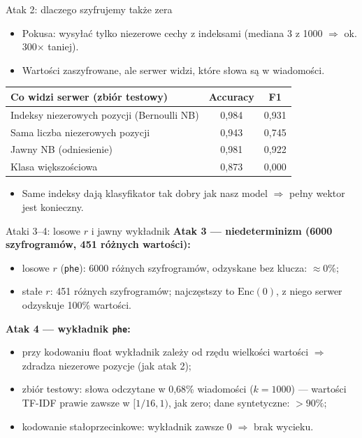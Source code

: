 \documentclass[aspectratio=169,11pt]{beamer}
\begin{document}
\begin{frame}{Atak 2: dlaczego szyfrujemy także zera}
  \begin{itemize}
    \item Pokusa: wysyłać tylko niezerowe cechy z indeksami (mediana 3 z 1000 $\Rightarrow$ ok. 300$\times$ taniej).
    \item Wartości zaszyfrowane, ale serwer widzi, \alert{które słowa} są w wiadomości.
  \end{itemize}
  \vspace{0.3em}
  \centering
  \begin{tabular}{@{}lcc@{}}
    \toprule
    Co widzi serwer (zbiór testowy) & Accuracy & F1 \\
    \midrule
    Indeksy niezerowych pozycji (Bernoulli NB) & 0,984 & 0,931 \\
    Sama liczba niezerowych pozycji & 0,943 & 0,745 \\
    Jawny NB (odniesienie) & 0,981 & 0,922 \\
    Klasa większościowa & 0,873 & 0,000 \\
    \bottomrule
  \end{tabular}
  \vspace{0.3em}
  \begin{itemize}
    \item Same indeksy dają klasyfikator \alert{tak dobry jak nasz model} $\Rightarrow$ pełny wektor jest konieczny.
  \end{itemize}
\end{frame}

\begin{frame}{Ataki 3--4: losowe $r$ i jawny wykładnik}
  \textbf{Atak 3 --- niedeterminizm (6000 szyfrogramów, 451 różnych wartości):}
  \begin{itemize}
    \item losowe $r$ (\texttt{phe}): 6000 różnych szyfrogramów, odzyskane bez klucza: $\approx 0\%$;
    \item stałe $r$: 451 różnych szyfrogramów; najczęstszy to $\mathrm{Enc}(0)$, z niego serwer odzyskuje \alert{100\%} wartości.
  \end{itemize}
  \vspace{0.5em}
  \textbf{Atak 4 --- wykładnik \texttt{phe}:}
  \begin{itemize}
    \item przy kodowaniu float wykładnik zależy od rzędu wielkości wartości $\Rightarrow$ zdradza niezerowe pozycje (jak atak 2);
    \item zbiór testowy: słowa odczytane w 0,68\% wiadomości ($k = 1000$) --- wartości TF-IDF prawie zawsze w $[1/16, 1)$, jak zero; dane syntetyczne: $> 90\%$;
    \item kodowanie stałoprzecinkowe: wykładnik zawsze $0$ $\Rightarrow$ \alert{brak wycieku}.
  \end{itemize}
\end{frame}
\end{document}
